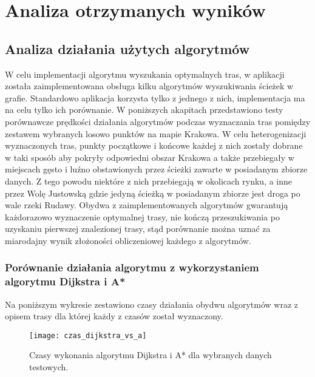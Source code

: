 \chapter{Analiza otrzymanych wyników}
\label{cha:analiza_otrzymanych_wynikow}


\section{Analiza działania użytych algorytmów}

W celu implementacji algorytmu wyszukania optymalnych tras, w aplikacji została zaimplementowana obsługa kilku algorytmów wyszukiwania ścieżek w grafie. Standardowo aplikacja korzysta tylko z jednego z nich, implementacja ma na celu tylko ich porównanie. W poniższych akapitach przedstawiono testy porównawcze prędkości działania algorytmów podczas wyznaczania tras pomiędzy zestawem wybranych losowo punktów na mapie Krakowa. 
W celu heterogenizacji wyznaczonych tras, punkty początkowe i końcowe każdej z nich zostały dobrane w taki sposób aby pokryły odpowiedni obszar Krakowa a także przebiegały w miejscach gęsto i luźno obstawionych przez ścieżki zawarte w posiadanym zbiorze danych. Z tego powodu niektóre z nich przebiegają w okolicach rynku, a inne przez Wolę Justowską gdzie jedyną ścieżką w posiadanym zbiorze jest droga po wale rzeki Rudawy.
Obydwa z zaimplementowanych algorytmów gwarantują każdorazowo wyznaczenie optymalnej trasy, nie kończą przeszukiwania po uzyskaniu pierwszej znalezionej trasy, stąd porównanie można uznać za miarodajny wynik złożoności obliczeniowej każdego z algorytmów.

\subsection{Porównanie działania algorytmu z wykorzystaniem algorytmu Dijkstra i A*}

Na poniższym wykresie zestawiono czasy działania obydwu algorytmów wraz z opisem trasy dla której każdy z czasów został wyznaczony.

\begin{figure}[H]
\centering
\texttt{[image: czas\_dijkstra\_vs\_a]}
\caption{Czasy wykonania algorytmu Dijkstra i A* dla wybranych danych testowych.}
\end{figure}

